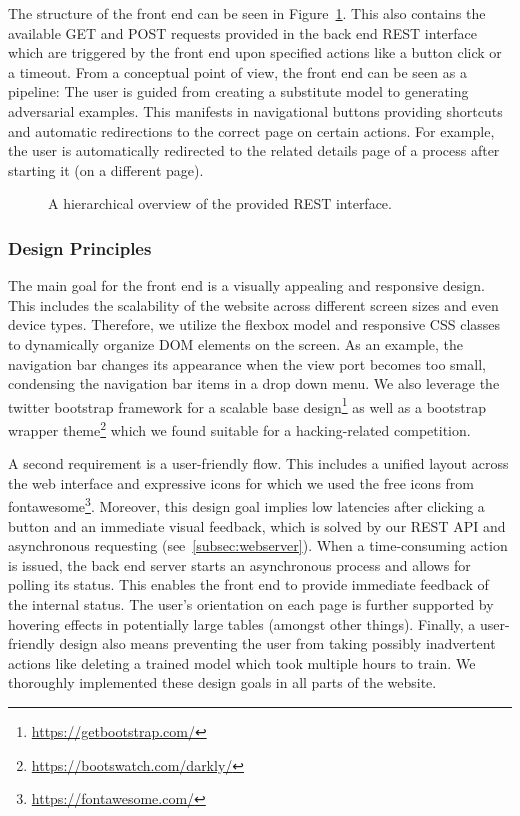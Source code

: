 The structure of the front end can be seen in Figure~\ref{fig:rest_api}.
This also contains the available GET and POST requests provided in the back end REST interface which are triggered by the front end upon specified actions like a button click or a timeout.
From a conceptual point of view, the front end can be seen as a pipeline: The user is guided from creating a substitute model to generating adversarial examples.
This manifests in navigational buttons providing shortcuts and automatic redirections to the correct page on certain actions.
For example, the user is automatically redirected to the related details page of a process after starting it (on a different page).

\begin{figure}
	
	\caption{A hierarchical overview of the provided REST interface.}\label{fig:rest_api}
\end{figure}

\subsubsection{Design Principles}
The main goal for the front end is a visually appealing and responsive design.
This includes the scalability of the website across different screen sizes and even device types.
Therefore, we utilize the flexbox model and responsive CSS classes to dynamically organize DOM elements on the screen.
As an example, the navigation bar changes its appearance when the view port becomes too small, condensing the navigation bar items in a drop down menu.
We also leverage the twitter bootstrap framework for a scalable base design\footnote{\url{https://getbootstrap.com/}} as well as a bootstrap wrapper theme\footnote{\url{https://bootswatch.com/darkly/}} which we found suitable for a hacking-related competition.

A second requirement is a user-friendly flow.
This includes a unified layout across the web interface and expressive icons for which we used the free icons from fontawesome\footnote{\url{https://fontawesome.com/}}.
Moreover, this design goal implies low latencies after clicking a button and an immediate visual feedback, which is solved by our REST API and asynchronous requesting (see~\ref{subsec:webserver}).
When a time-consuming action is issued, the back end server starts an asynchronous process and allows for polling its status.
This enables the front end to provide immediate feedback of the internal status.
The user's orientation on each page is further supported by hovering effects in potentially large tables (amongst other things).
Finally, a user-friendly design also means preventing the user from taking possibly inadvertent actions like deleting a trained model which took multiple hours to train.
We thoroughly implemented these design goals in all parts of the website.


